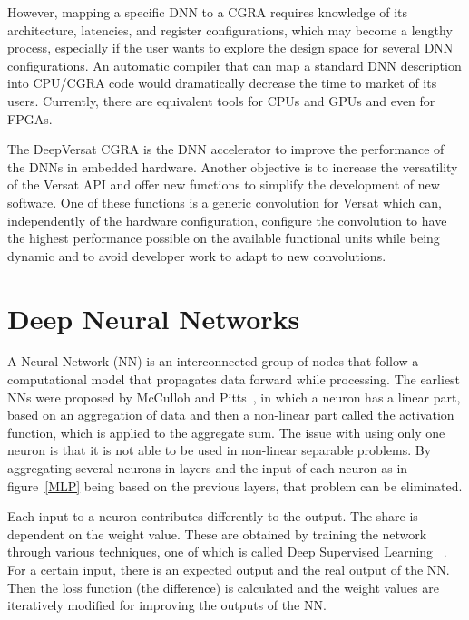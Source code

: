 \documentclass[conference]{IEEEtran}
\begin{document}
However, mapping a specific DNN to a CGRA requires knowledge of its
architecture, latencies, and register configurations, which may become a lengthy
process, especially if the user wants to explore the design space for several
DNN configurations. An automatic compiler that can map a standard DNN
description into CPU/CGRA code would dramatically decrease the time to market of its
users. Currently, there are equivalent tools for CPUs and GPUs and
even for FPGAs.

The DeepVersat CGRA is the DNN accelerator to improve the performance of the DNNs in embedded hardware.
Another objective is to increase the versatility of the Versat API and offer new functions
to simplify the development of new software. One of these functions is a generic convolution for
Versat which can, independently of the hardware configuration, configure the convolution to have
the highest performance possible on the available functional units while being dynamic and
to avoid developer work to adapt to new convolutions.


\section{Deep Neural Networks}
\label{chapter:cnn}


A Neural Network (NN) is an interconnected group of nodes that follow a
computational model that propagates data forward while processing. The earliest
NNs were proposed by McCulloh and Pitts~\cite{neuron:model}, in which a neuron
has a linear part, based on an aggregation of data and then a non-linear part
called the activation function, which is applied to the aggregate sum. The issue
with using only one neuron is that it is not able to be used in non-linear
separable problems. By aggregating several neurons in layers and the input of
each neuron as in figure~\ref{MLP} being based on the previous layers, that
problem can be eliminated.

Each input to a neuron contributes differently to the output. The share is
dependent on the weight value. These are obtained by training the network
through various techniques, one of which is called Deep Supervised
Learning~\cite{deeplearning} . For a certain input, there is an expected output
and the real output of the NN. Then the loss function (the difference) is
calculated and the weight values are iteratively modified for improving the
outputs of the NN.
\end{document}

